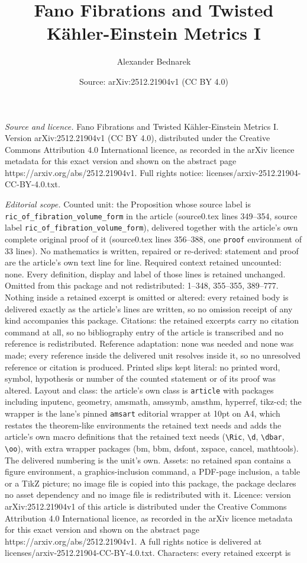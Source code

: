 \documentclass[10pt,a4paper]{amsart}
\title[Fano Fibrations and Twisted K\"ahler-Einstein Metrics I]{Fano Fibrations and Twisted K\"ahler-Einstein Metrics I}
\author{Alexander Bednarek}
\date{Source: arXiv:2512.21904v1 (CC BY 4.0)}
\begin{document}
\maketitle

\noindent\emph{Source and licence.} Fano Fibrations and Twisted K\"ahler-Einstein Metrics I. Version arXiv:2512.21904v1 (CC BY 4.0), distributed under the Creative Commons Attribution 4.0 International licence, as recorded in the arXiv licence metadata for this exact version and shown on the abstract page https://arxiv.org/abs/2512.21904v1. Full rights notice: licenses/arxiv-2512.21904-CC-BY-4.0.txt.\par\smallskip

\noindent\textit{Editorial scope.} Counted unit: the Proposition whose source label is \texttt{ric\_of\_fibration\_volume\_form} in the article (source0.tex lines 349--354, source label \texttt{ric\_of\_fibration\_volume\_form}), delivered together with the article's own complete original proof of it (source0.tex lines 356--388, one \texttt{proof} environment of 33 lines). No mathematics is written, repaired or re-derived: statement and proof are the article's own text line for line. Required context retained uncounted: none. Every definition, display and label of those lines is retained unchanged. Omitted from this package and not redistributed: 1--348, 355--355, 389--777. Nothing inside a retained excerpt is omitted or altered: every retained body is delivered exactly as the article's lines are written, so no omission receipt of any kind accompanies this package. Citations: the retained excerpts carry no citation command at all, so no bibliography entry of the article is transcribed and no reference is redistributed. Reference adaptation: none was needed and none was made; every reference inside the delivered unit resolves inside it, so no unresolved reference or citation is produced. Printed slips kept literal: no printed word, symbol, hypothesis or number of the counted statement or of its proof was altered. Layout and class: the article's own class is \texttt{article} with packages including inputenc, geometry, amsmath, amssymb, amsthm, hyperref, tikz-cd; the wrapper is the lane's pinned \texttt{amsart} editorial wrapper at 10pt on A4, which restates the theorem-like environments the retained text needs and adds the article's own macro definitions that the retained text needs (\texttt{\textbackslash Ric}, \texttt{\textbackslash d}, \texttt{\textbackslash dbar}, \texttt{\textbackslash oo}), with extra wrapper packages (bm, bbm, dsfont, xspace, cancel, mathtools). The delivered numbering is the unit's own. Assets: no retained span contains a figure environment, a graphics-inclusion command, a PDF-page inclusion, a table or a TikZ picture; no image file is copied into this package, the package declares no asset dependency and no image file is redistributed with it. Licence: version arXiv:2512.21904v1 of this article is distributed under the Creative Commons Attribution 4.0 International licence, as recorded in the arXiv licence metadata for this exact version and shown on the abstract page https://arxiv.org/abs/2512.21904v1. A full rights notice is delivered at licenses/arxiv-2512.21904-CC-BY-4.0.txt. Characters: every retained excerpt is 
\end{document}
